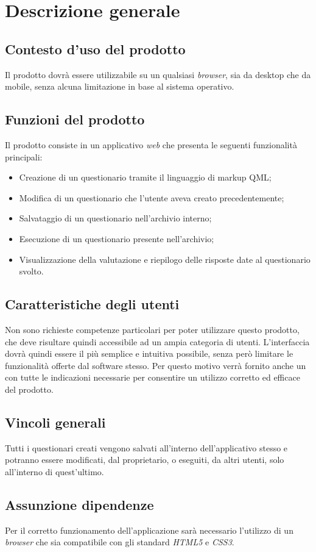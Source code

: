 \newpage
\section{Descrizione generale}
\subsection{Contesto d'uso del prodotto}
Il prodotto dovrà essere utilizzabile su un qualsiasi \textit{browser}, sia da desktop che da mobile, senza alcuna limitazione in base al sistema operativo.
\subsection{Funzioni del prodotto}
Il prodotto consiste in un applicativo \textit{web} che presenta le seguenti funzionalità principali:
\begin{itemize}
\item Creazione di un questionario tramite il linguaggio di markup QML;
\item Modifica di un questionario che l'utente aveva creato precedentemente;
\item Salvataggio di un questionario nell'archivio interno;
\item Esecuzione di un questionario presente nell'archivio;
\item Visualizzazione della valutazione e riepilogo delle risposte date al questionario svolto.
\end{itemize}
\subsection{Caratteristiche degli utenti}
Non sono richieste competenze particolari per poter utilizzare questo prodotto, che deve risultare quindi accessibile ad un ampia categoria di utenti. L'interfaccia dovrà quindi essere il più semplice e intuitiva possibile, senza però limitare le funzionalità offerte dal software stesso. Per questo motivo verrà fornito anche un \textit{\MU} con tutte le indicazioni necessarie per consentire un utilizzo corretto ed efficace del prodotto.
\subsection{Vincoli generali}
Tutti i questionari creati vengono salvati all'interno dell'applicativo stesso e potranno essere modificati, dal proprietario, o eseguiti, da altri utenti, solo all'interno di quest'ultimo.
\subsection{Assunzione dipendenze}
Per il corretto funzionamento dell'applicazione sarà necessario l'utilizzo di un \textit{browser} che sia compatibile con gli standard \textit{HTML5} e \textit{CSS3}.